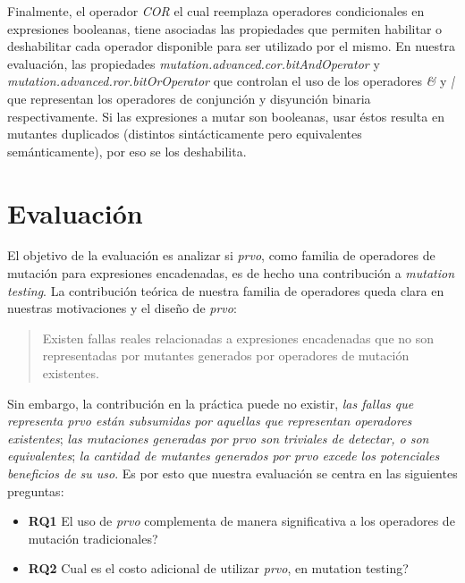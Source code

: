 Finalmente, el operador \emph{COR} el cual reemplaza operadores condicionales en expresiones booleanas, tiene asociadas las propiedades que permiten habilitar o deshabilitar cada operador disponible para ser utilizado por el mismo. En nuestra evaluaci\'on, las propiedades \emph{mutation.advanced.cor.bitAndOperator} y \emph{mutation.advanced.ror.bitOrOperator} que controlan el uso de los operadores \emph{\&} y \emph{|} que representan los operadores de conjunci\'on y disyunci\'on binaria respectivamente. Si las expresiones a mutar son booleanas, usar \'estos resulta en mutantes duplicados (distintos sint\'acticamente pero equivalentes sem\'anticamente), por eso se los deshabilita.

\section{Evaluaci\'on}
\label{sec:evaluation.evaluation}

El objetivo de la evaluaci\'on es analizar si \emph{prvo}, como familia de operadores de mutaci\'on para expresiones encadenadas, es de hecho una contribuci\'on a \emph{mutation testing}. La contribuci\'on te\'orica de nuestra familia de operadores queda clara en nuestras motivaciones y el dise\~no de \emph{prvo}:
\begin{quote}
  Existen fallas reales relacionadas a expresiones encadenadas que no son representadas por mutantes generados por operadores de mutaci\'on existentes.
\end{quote}
Sin embargo, la contribuci\'on en la pr\'actica puede no existir, \emph{las fallas que representa prvo est\'an subsumidas por aquellas que representan operadores existentes}; \emph{las mutaciones generadas por prvo son triviales de detectar, o son equivalentes}; \emph{la cantidad de mutantes generados por prvo excede los potenciales beneficios de su uso}. Es por esto que nuestra evaluaci\'on se centra en las siguientes preguntas:
\begin{itemize}
	\item \textbf{RQ1} El uso de \emph{prvo} complementa de manera significativa a los operadores de mutaci\'on tradicionales?
	
	\item \textbf{RQ2} Cual es el costo adicional de utilizar \emph{prvo}, en mutation testing?
\end{itemize}

